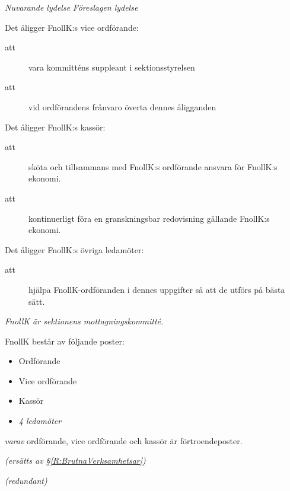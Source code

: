 \documentclass{article}
\newenvironment{lydelse}
    {\begin{paracol}{2}%
        \emph{Nuvarande lydelse}%
        \switchcolumn%
        \emph{Föreslagen lydelse}%
    \end{paracol}%
    \begin{enumerate}[label=\thesubsection.\arabic*]%
    \begin{paracol}{2}%
    }{\end{paracol}\end{enumerate}}
\begin{document}
\begin{lydelse}
	\item Det åligger FnollK:s vice ordförande:
			\begin{description}
				\item[att] vara kommitténs suppleant i sektionsstyrelsen
				\item[att] vid ordförandens frånvaro överta dennes åligganden
			\end{description}

		\item Det åligger FnollK:s kassör:
			\begin{description}
				\item[att] sköta och tillsammans med FnollK:s ordförande ansvara för FnollK:s ekonomi.
				\item[att] kontinuerligt föra en granskningsbar redovisning gällande FnollK:s ekonomi.
			\end{description}

		\item Det åligger FnollK:s övriga ledamöter:
			\begin{description}
				\item[att] hjälpa FnollK-ordföranden i dennes uppgifter så att de utförs på bästa sätt.
			\end{description}
    
    \setcounter{section}{5}
    \setcounter{subsection}{4}
    
    \switchcolumn 
    
    \item \emph{FnollK är sektionens mottagningskommitté.}

    \item FnollK består av följande poster:
    \begin{itemize}
        \item Ordförande
    	\item Vice ordförande
    	\item Kassör
    	\item \emph{4 ledamöter}
    \end{itemize}
    \emph{varav} ordförande, vice ordförande och kassör är förtroendeposter.
    
    \item[] \emph{(ersätts av \S \ref{R:BrutnaVerksamhetsar})}\vspace{1.2em}
    
    \item[] \emph{(redundant)}\vspace{2.4em}
    

\end{lydelse}
\end{document}
